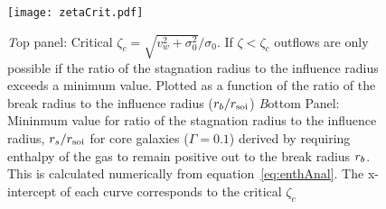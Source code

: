 \begin{figure}
\texttt{[image: zetaCrit.pdf]}
\caption{\label{fig:zetaCrit} {\emph Top panel:} Critical
  $\zeta_c=\sqrt{v_w^2+\sigma_0^2}/\sigma_0$. If $\zeta<\zeta_c$ outflows are
  only possible if the ratio of the stagnation radius to the influence
  radius exceeds a minimum value. Plotted as a function of the ratio
  of the break radius to the influence radius ($r_b/r_{\rm soi}$) {\emph Bottom
    Panel:} Mininmum value for ratio of the stagnation radius to the
  influence radius, $r_s/r_{\rm soi}$ for core galaxies ($\Gamma=0.1$)
  derived by requiring enthalpy of the gas to remain positive out to
  the break radius $r_b$. This is calculated numerically from
  equation~\eqref{eq:enthAnal}. The x-intercept of each curve
  corresponds to the critical $\zeta_c$}
\end{figure}


